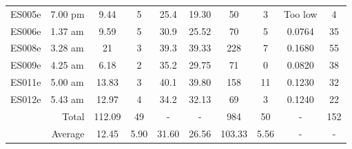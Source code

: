\begin{table}[tb]
\begin{tabular}{llcccccccc}
    ES005e & 7.00 pm & 9.44 & 5 & 25.4 & 19.30 & 50 & 3 & Too low & 4 \\
    ES006e & 1.37 am & 9.59 & 5 & 30.9 & 25.52 & 70 & 5 & 0.0764 & 35 \\
    ES008e & 3.28 am & 21 & 3 & 39.3 & 39.33 & 228 & 7 & 0.1680 & 55 \\
    ES009e & 4.25 am & 6.18 & 2 & 35.2 & 29.75 & 71 & 0 & 0.0820 & 38 \\
    ES011e & 5.00 am & 13.83 & 3 & 40.1 & 39.80 & 158 & 11 & 0.1230 & 32 \\
    ES012e & 5.43 am & 12.97 & 4 & 34.2 & 32.13 & 69 & 3 & 0.1240 & 22 \\
    \midrule
    \multicolumn{2}{r}{Total} & 112.09 & 49 & - & - & 984 & 50 & - & 152 \\
    \multicolumn{2}{r}{Average} & 12.45 & 5.90 & 31.60 & 26.56 & 103.33 & 5.56 & - & -\\
    \bottomrule
    \end{tabular}%
  \label{tab:1-metadata}%
\end{table}%

